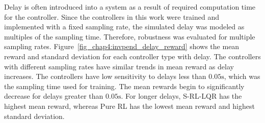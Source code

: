 Delay is often introduced into a system as a result of required computation time for the controller.
Since the controllers in this work were trained and implemented with a fixed sampling rate, the simulated delay was modeled as multiples of the sampling time. Therefore, robustness was evaluated for multiple sampling rates.
%
Figure~\ref{fig_chap4:invpend_delay_reward} shows the mean reward and standard deviation for each controller type with delay.
%
%
The controllers with different sampling rates have similar trends in mean reward as delay increases. The controllers have low sensitivity to delays less than $0.05\si{\second}$, which was the sampling time used for training. The mean rewards begin to significantly decrease for delays greater than $0.05\si{\second}$. For longer delays, S-RL-LQR has the highest mean reward, whereas Pure RL has the lowest mean reward and highest standard deviation.
%
%
